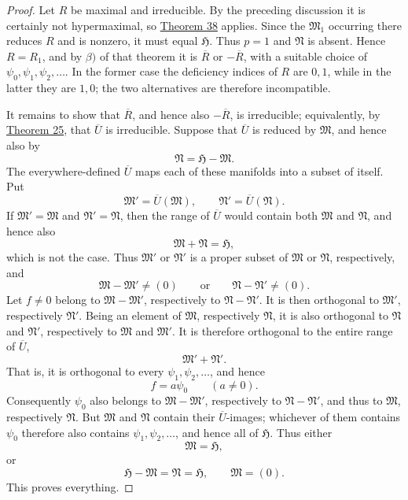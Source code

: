 ﻿\documentclass[paper=b5,fontsize=13pt,bookmarkpackage=false,twoside]{scrartcl}
\begin{document}
\begin{proof}
Let $R$ be maximal and irreducible. By the preceding discussion it is certainly not hypermaximal, so \hyperref[thm:38]{Theorem 38} applies. Since the $\mathfrak M_1$ occurring there reduces $R$ and is nonzero, it must equal $\mathfrak H$. Thus $p=1$ and $\mathfrak N$ is absent. Hence $R=R_1$, and by $\beta)$ of that theorem it is $\overline R$ or $-\overline R$, with a suitable choice of $\psi_0,\psi_1,\psi_2,\ldots$. In the former case the deficiency indices of $R$ are $0,1$, while in the latter they are $1,0$; the two alternatives are therefore incompatible.

It remains to show that $\overline R$, and hence also $-\overline R$, is irreducible; equivalently, by \hyperref[thm:25]{Theorem 25}, that $\overline U$ is irreducible. Suppose that $\overline U$ is reduced by $\mathfrak M$, and hence also by
\[
\mathfrak N=\mathfrak H-\mathfrak M.
\]
The everywhere-defined $\overline U$ maps each of these manifolds into a subset of itself. Put
\[
\mathfrak M'=\overline U(\mathfrak M),
\qquad
\mathfrak N'=\overline U(\mathfrak N).
\]
If $\mathfrak M'=\mathfrak M$ and $\mathfrak N'=\mathfrak N$, then the range of $\overline U$ would contain both $\mathfrak M$ and $\mathfrak N$, and hence also
\[
\mathfrak M+\mathfrak N=\mathfrak H,
\]
which is not the case. Thus $\mathfrak M'$ or $\mathfrak N'$ is a proper subset of $\mathfrak M$ or $\mathfrak N$, respectively, and
\[
\mathfrak M-\mathfrak M'\ne(0)
\qquad\text{or}\qquad
\mathfrak N-\mathfrak N'\ne(0).
\]
Let $f\ne0$ belong to $\mathfrak M-\mathfrak M'$, respectively to $\mathfrak N-\mathfrak N'$. It is then orthogonal to $\mathfrak M'$, respectively $\mathfrak N'$. Being an element of $\mathfrak M$, respectively $\mathfrak N$, it is also orthogonal to $\mathfrak N$ and $\mathfrak N'$, respectively to $\mathfrak M$ and $\mathfrak M'$. It is therefore orthogonal to the entire range of $\overline U$,
\[
\mathfrak M'+\mathfrak N'.
\]
That is, it is orthogonal to every $\psi_1,\psi_2,\ldots$, and hence
\[
f=a\psi_0
\qquad(a\ne0).
\]
Consequently $\psi_0$ also belongs to $\mathfrak M-\mathfrak M'$, respectively to $\mathfrak N-\mathfrak N'$, and thus to $\mathfrak M$, respectively $\mathfrak N$. But $\mathfrak M$ and $\mathfrak N$ contain their $\overline U$-images; whichever of them contains $\psi_0$ therefore also contains $\psi_1,\psi_2,\ldots$, and hence all of $\mathfrak H$. Thus either
\[
\mathfrak M=\mathfrak H,
\]
or
\[
\mathfrak H-\mathfrak M=\mathfrak N=\mathfrak H,
\qquad
\mathfrak M=(0).
\]
This proves everything.
\end{proof}
\end{document}
